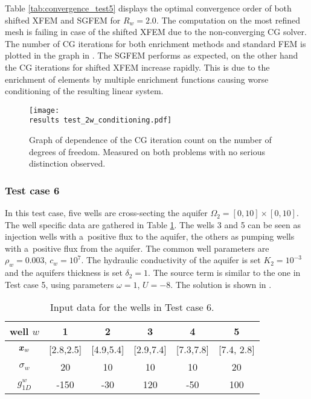 Table \ref{tab:convergence_test5} displays the optimal convergence order of both shifted XFEM and SGFEM for $R_w=2.0$.
The computation on the most refined mesh is failing in case of the shifted XFEM due to the non-converging CG solver.
The number of CG iterations for both enrichment methods and standard FEM is plotted in the graph in .
The SGFEM performs as expected, on the other hand the CG iterations for shifted XFEM increase rapidly.
This is due to the enrichment of elements by multiple enrichment functions causing worse conditioning of the resulting linear system.
%
\begin{figure}[!htb]
  \centering    
    \texttt{[image: \\results test\_2w\_conditioning.pdf]}
  \caption[CG iterations count in Test case 3]{Graph of dependence of the CG iteration count on the 
  number of degrees of freedom. Measured on both problems with no serious distinction observed.}
  \label{fig:test_2w_conditioning}
\end{figure}



\subsubsection{Test case 6}
In this test case, five wells are cross-secting the aquifer $\Omega_2 = [0,10]\times[0, 10]$.
The well specific data are gathered in Table \ref{tab:test_case6_wells_data}.
The wells 3 and 5 can be seen as injection wells with a~positive flux to the aquifer, the others as pumping wells with a~positive flux from the aquifer.
The common well parameters are $\rho_w = 0.003$, $c_w = 10^{7}$.
The hydraulic conductivity of the aquifer is set $K_2=10^{-3}$ and the aquifers thickness is set $\delta_2=1$.
The source term is similar to the one in Test case 5, using parameters $\omega=1$, $U=-8$.
The solution is shown in .
%
\begin{table}[!htb]
\begin{center}
\begin{tabular}{c|ccccc}
\toprule
well $w$ & 1 & 2 & 3 & 4 & 5 \\
\midrule
$\mathbf{\boldsymbol{x}}_w$     & [2.8,2.5]  & [4.9,5.4]  & [2.9,7.4]  & [7.3,7.8] & [7.4, 2.8] \\
$\sigma_w$  & 20   & 10  & 10  & 10  & 20 \\
$g^w_{1D}$  & -150 & -30 & 120 & -50 & 100 \\
\bottomrule
\end{tabular}
\caption{Input data for the wells in Test case 6.}
\label{tab:test_case6_wells_data}
\end{center}
\end{table}

